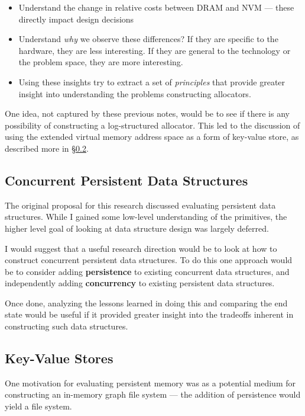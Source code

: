 \begin{itemize}
    \item Understand the change in relative costs between DRAM and NVM --- these directly impact design decisions
    \item Understand \textit{why} we observe these differences?  If they are specific to the hardware, they are less interesting.  If they are general to the technology or the problem space, they are more interesting.
    \item Using these insights try to extract a set of \textit{principles} that provide greater insight into understanding the problems constructing allocators.
\end{itemize}

One idea, not captured by these previous notes, would be to see if there is any possibility of constructing a log-structured allocator.  This led to the discussion of using the extended virtual memory address space as a form of key-value store, as described more in \S \ref{discussion:kvstore}.

\subsection{Concurrent Persistent Data Structures}\label{discussion:cpds}

The original proposal for this research discussed evaluating
persistent data structures.  While I gained some low-level
understanding of the primitives, the higher level goal of
looking at data structure design was largely deferred.

I would suggest that a useful research direction would be to look at how to construct concurrent persistent data structures.  To do this one approach would be to consider adding \textbf{persistence}
to existing concurrent data structures, and independently adding
\textbf{concurrency} to existing persistent data structures.

Once done, analyzing the lessons learned in doing this and comparing the end state would be useful if it provided greater insight into the tradeoffs inherent in constructing such data structures.

\subsection{Key-Value Stores}\label{discussion:kvstore}

One motivation for evaluating persistent memory was as a
potential medium for constructing an in-memory graph file
system --- the addition of persistence would yield a file system.

